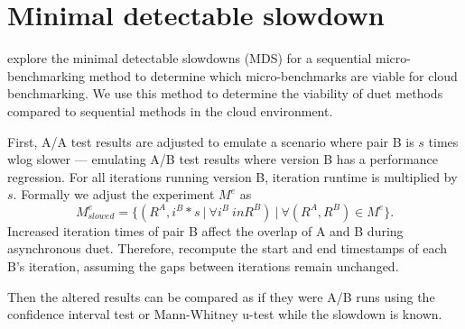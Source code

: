 \section{Minimal detectable slowdown}
\label{sec:mds}

 explore the minimal detectable slowdowns (MDS) for a sequential micro-benchmarking method to determine which micro-benchmarks are viable for cloud benchmarking.
We use this method to determine the viability of duet methods compared to sequential methods in the cloud environment.

First, A/A test results are adjusted to emulate a scenario where pair B is $s$ times wlog slower --- emulating A/B test results where version B has a performance regression.
For all iterations running version B, iteration runtime is multiplied by $s$.
Formally we adjust the experiment $M^{e}$ as
$$
M^{e}_{slowed} = \{(R^A, {i^B * s~|~\forall i^B \ in R^B})~|~\forall (R^A, R^B) \in M^{e}\}.
$$
Increased iteration times of pair B affect the overlap of A and B during asynchronous duet.
Therefore, recompute the start and end timestamps of each B's iteration, assuming the gaps between iterations remain unchanged.

Then the altered results can be compared as if they were A/B runs using the confidence interval test or \mbox{Mann-Whitney} \mbox{u-test} while the slowdown is known.
